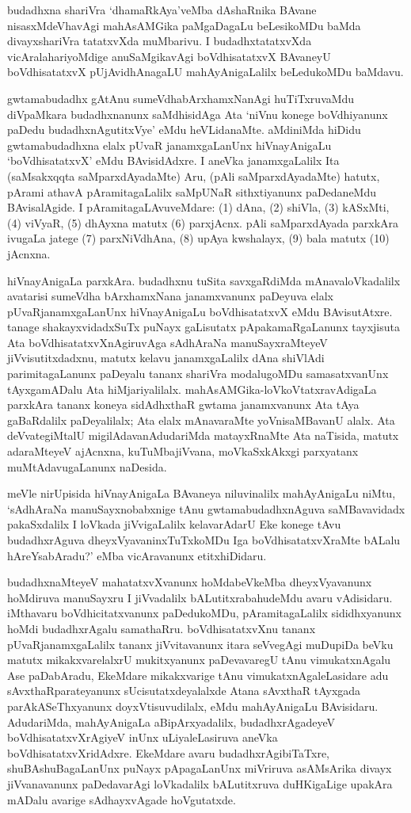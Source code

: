 budadhxna shariVra `dhamaRkAya'veMba dAshaRnika BAvane nisasxMdeVhavAgi mahA\-sAMGika paMgaDagaLu beLesikoMDu baMda divayxshariVra tatatxvXda muMbarivu. I budadhxtatatxvXda vicAralahariyoMdige anuSaMgikavAgi boVdhisatatxvX BAvaneyU boVdhisatatxvX pUjAvidhAnagaLU mahAyAnigaLalilx beLedukoMDu baMdavu.

gwtamabudadhx gAtAnu sumeVdhabArxhamxNanAgi huTiTxruvaMdu diVpaMkara budadhxnanunx saMdhisidAga Ata `niVnu konege boVdhiyanunx paDedu budadhxnAgutitxVye' eMdu heVLidanaMte. aMdiniMda hiDidu gwtamabudadhxna elalx pUvaR janamxgaLanUnx hiVnayAnigaLu `boVdhisatatxvX' eMdu BAvisidAdxre. I aneVka janamxgaLalilx Ita (saMsakxqqta saMparxdAyadaMte) Aru, (pAli saMparxdAyadaMte) hatutx, pArami athavA pAramitagaLalilx saMpUNaR sithxtiyanunx paDedaneMdu BAvisalAgide. I pAramitagaLAvuveMdare: (1) dAna, (2) shiVla, (3) kASxMti, (4) viVyaR, (5) dhAyxna matutx (6) parxjAcnx. pAli saMparxdAyada parxkAra ivugaLa jatege (7) parxNiVdhAna, (8) upAya kwshalayx, (9) bala matutx (10) jAcnxna.

hiVnayAnigaLa parxkAra. budadhxnu tuSita savxgaRdiMda mAnavaloVkadalilx avatarisi sumeVdha bArxhamxNana janamxvanunx paDeyuva elalx pUvaRjanamxgaLanUnx hiVnayAnigaLu boVdhisatatxvX eMdu BAvisutAtxre. tanage shakayxvidadxSuTx puNayx gaLisutatx pApakamaR\-gaLanunx tayxjisuta Ata boVdhisatatxvXnAgiruvAga sAdhAraNa manuSayxraMteyeV jiVvisutitxdadxnu, matutx kelavu janamxgaLalilx dAna shiVlAdi parimitagaLanunx paDeyalu tananx shariVra modalu\-goMDu samasatxvanUnx tAyxgamADalu Ata hiMjariyalilalx. mahAsAMGika-loVkoV\-tatxravAdigaLa parxkAra tananx koneya sidAdhxthaR gwtama janamxvanunx Ata tAya gaBaRdalilx paDeyalilalx; Ata elalx mAnavaraMte yoVnisaMBavanU alalx. Ata deVvategiMtalU migilAdavanAdudariMda matayxRnaMte Ata naTisida, matutx adaraMteyeV ajAcnxna, kuTuMbajiVvana, moVkaSxkAkxgi parxyatanx muMtAdavugaLanunx naDesida.

meVle nirUpisida hiVnayAnigaLa BAvaneya niluvinalilx mahAyAnigaLu niMtu, `sAdhAraNa manuSayxnobabxnige tAnu gwtamabudadhxnAguva saMBavavidadx pakaSxdalilx I loVkada jiVvigaLalilx kelavarAdarU Eke konege tAvu budadhxrAguva dheyxVyavaninxTuTxkoMDu Iga boVdhisatatxvXraMte bALalu hAreYsabAradu?' eMba vicAravanunx etitxhiDidaru.

budadhxnaMteyeV mahatatxvXvanunx hoMdabeVkeMba dheyxVyavanunx hoMdiruva manu\-Sayxru I jiVvadalilx bALutitxrabahudeMdu avaru vAdisidaru. iMthavaru boVdhicitatx\-vanunx paDedukoMDu, pAramitagaLalilx sididhxyanunx hoMdi budadhxrAgalu samathaRru. boVdhisatatxvXnu tananx pUvaRjanamxgaLalilx tananx jiVvitavanunx itara seVvegAgi muDu\-piDa beVku matutx mikakxvarelalxrU mukitxyanunx paDevavaregU tAnu vimukatxnAgalu Ase paDa\-bAradu, EkeMdare mikakxvarige tAnu vimukatxnAgaleLasidare adu sAvxthaRparateyanunx sUcisutatxdeyalalxde Atana sAvxthaR tAyxgada parAkASeThxyanunx doyxVtisuvudilalx, eMdu mahAyAnigaLu BAvisidaru. AdudariMda, mahAyAnigaLa aBipArxyadalilx, budadhx\-rAgadeyeV boVdhisatatxvXrAgiyeV inUnx uLiyaleLasiruva aneVka boVdhisatatxvX\-ridAdxre. EkeMdare avaru budadhxrAgibiTaTxre, shuBAshuBagaLanUnx puNayx pApagaLanUnx miVriruva asAMsArika divayx jiVvanavanunx paDedavarAgi loVkadalilx bALutitxruva duHKigaLige upakAra mADalu avarige sAdhayxvAgade hoVgutatxde.

